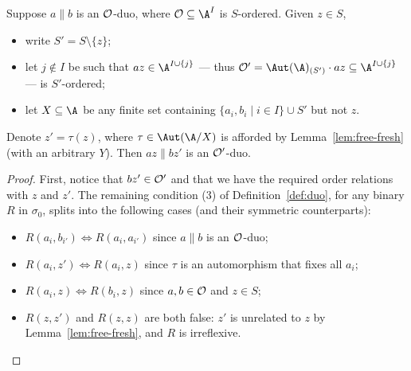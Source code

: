\begin{lemma}\label{lem:cog-fresh-single}
    Suppose $a\parallel b$ is an $\cal O$-duo, where $\cal O \subseteq \A^I$ is $S$-ordered.
    Given $z \in S$, 
    \begin{itemize}
        \item write $S' = S \setminus \{z\}$;
        \item let $j \not\in I$ be such that $a z \in \A^{I \cup \{j\}}$ --- thus ${\cal O'}=\Aut(\A)_{(S')} \cdot az \subseteq \A^{I \cup \{j\}}$ --- is $S'$-ordered;
        \item let $X \subseteq \A$ be any finite set containing $\{a_i, b_i \mid i \in I\} \cup S'$ but not $z$.
    \end{itemize}
    Denote $z'=\tau(z)$, where $\tau \in \Aut(\A/X)$ is afforded by Lemma~\ref{lem:free-fresh} (with an arbitrary $Y$). Then $az \parallel bz'$ is an $\cal O'$-duo.
\end{lemma}
\begin{proof}
    First, notice that $bz'\in {\cal O}'$ and that we have the required order relations with $z$ and $z'$. The remaining condition (3) of Definition~\ref{def:duo}, for any binary $R$ in $\sigma_0$, splits into the following cases (and their symmetric counterparts):
\begin{itemize}
\item $R(a_i,b_{i'})\iff R(a_i,a_{i'})$ since $a \parallel b$ is an $\cal O$-duo;
\item $R(a_i,z')\iff R(a_i,z)$ since $\tau$ is an automorphism that fixes all $a_i$;
\item $R(a_i,z)\iff R(b_i,z)$ since $a, b \in \cal O$ and $z\in S$;
\item $R(z,z')$ and $R(z,z)$ are both false: $z'$ is unrelated to $z$ by Lemma~\ref{lem:free-fresh}, and $R$ is irreflexive. \qedhere
\end{itemize}
\end{proof}

